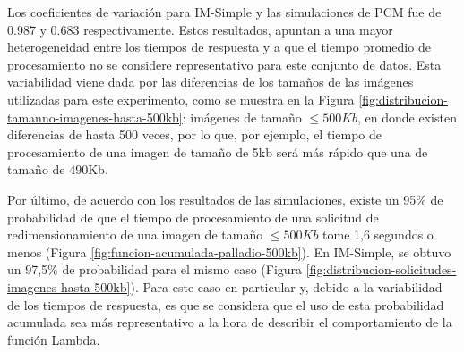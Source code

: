 Los coeficientes de variación para IM-Simple y las simulaciones de PCM fue de 0.987 y 0.683 respectivamente. Estos resultados, apuntan a una mayor heterogeneidad entre los tiempos de respuesta y a que el tiempo promedio de procesamiento no se considere representativo para este conjunto de datos. Esta variabilidad viene dada por las diferencias de los tamaños de las imágenes utilizadas para este experimento, como se muestra en la Figura \ref{fig:distribucion-tamanno-imagenes-hasta-500kb}: imágenes de tamaño $\leq 500Kb$, en donde existen diferencias de hasta 500 veces, por lo que, por ejemplo, el tiempo de procesamiento de una imagen de tamaño de 5kb será más rápido que una de tamaño de 490Kb.

Por último, de acuerdo con los resultados de las simulaciones, existe un 95\% de probabilidad de que el tiempo de procesamiento de una solicitud de redimensionamiento de una imagen de tamaño $\leq 500Kb$ tome 1,6 segundos o menos (Figura \ref{fig:funcion-acumulada-palladio-500kb}). En IM-Simple, se obtuvo un 97,5\% de probabilidad para el mismo caso (Figura \ref{fig:distribucion-solicitudes-imagenes-hasta-500kb}). Para este caso en particular y, debido a la variabilidad de los tiempos de respuesta, es que se considera que el uso de esta probabilidad acumulada sea más representativo a la hora de describir el comportamiento de la función Lambda.


